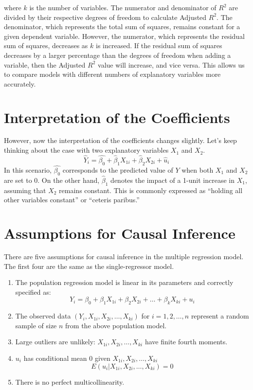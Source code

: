 \documentclass{./../../Latex/handout}
\begin{document}
where $k$ is the number of variables. The numerator and denominator of $R^2$ are divided by their respective degrees of freedom to calculate Adjusted $R^2$. The denominator, which represents the total sum of squares, remains constant for a given dependent variable. However, the numerator, which represents the residual sum of squares, decreases as $k$ is increased. If the residual sum of squares decreases by a larger percentage than the degrees of freedom when adding a variable, then the Adjusted $R^2$ value will increase, and vice versa. This allows us to compare models with different numbers of explanatory variables more accurately. 

\section{Interpretation of the Coefficients}

However, now the interpretation of the coefficients changes slightly. Let's keep thinking about the case with two explanatory variables $X_1$ and $X_2$. 
$$ \hat{Y}_i = \hat{\beta_0} + \hat{\beta}_1 X_{1i} + \hat{\beta}_2 X_{2i} + \hat{u}_i  $$ 
In this scenario, $\hat{\beta_0}$ corresponds to the predicted value of $Y$ when both $X_1$ and $X_2$ are set to 0. On the other hand, $\hat{\beta}_1$ denotes the impact of a 1-unit increase in $X_1$, assuming that $X_2$ remains constant. This is commonly expressed as ``holding all other variables constant'' or ``ceteris paribus.''

\section{Assumptions for Causal Inference}
There are five assumptions for causal inference in the multiple regression model. The first four are the same as the single-regressor model.
\begin{enumerate}
  \item The population regression model is linear in its parameters and correctly specified as:
$$ Y_i = \beta_0 + \beta_1 X_{1i} + \beta_2 X_{2i} + \hdots + \beta_k X_{ki}+ u_i  $$ 
\item The observed data $(Y_i ,X_{1i}, X_{2i}, \hdots, X_{ki})$ for $i=1, 2,\hdots, n$ represent a random sample of size $n$ from the above population model. 
\item Large outliers are unlikely: $ X_{1i}, X_{2i}, \hdots, X_{ki}$ have finite fourth moments.
\item $u_i$ has conditional mean 0 given  $X_{1i}, X_{2i}, \hdots, X_{ki}$
$$ E(u_i | X_{1i}, X_{2i}, \hdots, X_{ki})=0 $$
  \item There is no perfect multicollinearity.
\end{enumerate}
\end{document}
